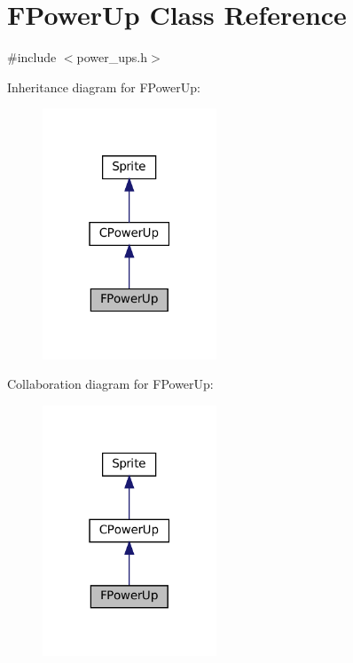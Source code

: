 \hypertarget{classFPowerUp}{}\section{F\+Power\+Up Class Reference}
\label{classFPowerUp}


{\ttfamily \#include $<$power\+\_\+ups.\+h$>$}



Inheritance diagram for F\+Power\+Up\+:
\nopagebreak
\begin{figure}[H]
\begin{center}
\leavevmode
\includegraphics[width=147pt]{classFPowerUp__inherit__graph}
\end{center}
\end{figure}


Collaboration diagram for F\+Power\+Up\+:
\nopagebreak
\begin{figure}[H]
\begin{center}
\leavevmode
\includegraphics[width=147pt]{classFPowerUp__coll__graph}
\end{center}
\end{figure}
